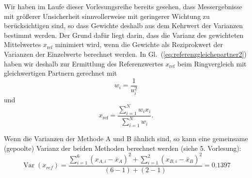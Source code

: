 Wir haben im Laufe dieser Vorlesungsreihe bereits gesehen, dass
Messergebnisse mit größerer Unsicherheit sinnvollerweise mit geringerer
Wichtung zu berücksichtigen sind, so dass Gewichte
deshalb aus dem Kehrwert der Varianzen bestimmt werden. Der Grund dafür liegt darin,
dass die Varianz des gewichteten Mittelwertes $x_\mathrm{ref}$ minimiert wird,
wenn die Gewichte als Reziprokwert der Varianzen der Einzelwerte berechnet werden.
In Gl.~(\ref{eq:referenzgleichepartner2})
haben wir deshalb zur Ermittlung des Referenzwertes $x_\mathrm{ref}$ beim
Ringvergleich mit gleichwertigen Partnern gerechnet mit
\begin{equation*}
    w_i = \frac{1}{u^2_i}
\end{equation*}
und
\begin{equation*}
 x_\mathrm{ref} = \frac{\sum\limits_{i=1}^N w_i x_i}{\sum\limits_{i=1}^N w_i} .
\end{equation*}

\begin{comment}
\textcolor{red}{wahrscheinlich macht es keinen Sinn mit der empirischen Varianz
anzufangen, sondern direkt mit der empirischen Var des Mittelwertes, also nehme ich
diesen Teil wieder zurück}
\textcolor{blue}{Verwenden wir für die Unsicherheit $u_i$ die empirische Varianz
$u_i = \operatorname{Var}(x_i)$ für Beispiel II folgende Werte
$$
\operatorname{Var}(x_{II,A}) =
\frac{1}{6-1} \sum\limits_{k=1}^{6} \left(x_{II,k} - \bar x_{II,A} \right)^2 = 0.14267
$$
und
$$
\operatorname{Var}(x_{II,B}) = \frac{1}{2-1} \sum\limits_{k=7}^{8} \left(x_{II,k} - \bar x_{II,B} \right)^2
= 0.12500
$$
so erhalten wir für die beiden Gewichte $w_A = 7.0093$ und $w_B = 8.0000$, die beide fast gleich.
Der gewichtete Mittelwert, der als Referenzwert für En-Tests und das Birge-Verhältnis genutzt wird ist damit
$$
x_\mathrm{ref} \; = \; \frac{7.0093 \cdot 1.533 \; + \; 8.0000 \cdot 16.550}{7.0093 + 8.0000}
\; = \; 9.5372
$$
Nach Gl.~(\ref{eq:Birge-Verhaeltnis}) das Birge-Verhältnis hierfür
$$
R^2_\mathrm{B} \; = \; \frac{1}{N-1} \; \sum_{i=1}^N \left( \frac{x_i-x_\mathrm{ref}}{u^2(x_i)} \right)^2 \; = \;
 \frac{1}{2-1} \, \left( \frac{\left(1.5333 - 9.5372\right)^2}{0.14267}
 \, + \, \frac{ \left( 16.550 - 9.5372 \right)^2}{0.12500} \right) = 842.47 \gg 1
$$
--nix!}
\end{comment}

Wenn die Varianzen
der Methode A und B ähnlich sind, so kann eine gemeinsame (gepoolte) Varianz der beiden Methoden berechnet werden (siehe 5. Vorlesung):
\begin{equation}
\operatorname{Var}(x_{ref}) = \frac{\sum\limits_{i=1}^6 \left(x_{A,i}-\bar x_A\right )^2+\sum\limits_{i=1}^2 \left(x_{B,i}-\bar x_B\right )^2}{(6-1)+(2-1)} = 0.1397
\end{equation}

